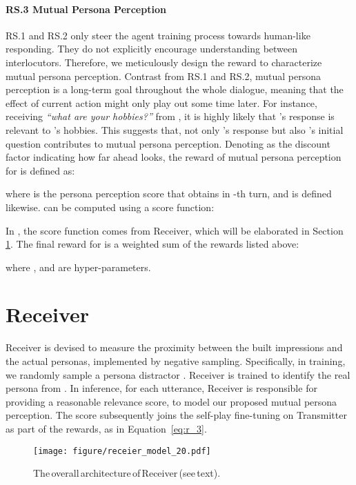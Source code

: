 \documentclass[11pt,a4paper]{article}
\begin{document}
\paragraph{RS.3 Mutual Persona Perception} 
RS.1 and RS.2 only steer the agent training process towards human-like responding. They do not explicitly encourage understanding between interlocutors. Therefore, we meticulously design the reward to characterize mutual persona perception. 
Contrast from RS.1 and RS.2, mutual persona perception is a long-term goal throughout the whole dialogue, 
meaning that the effect of current action might only play out some time later. 
For instance, receiving \textit{``what are your hobbies?''} from , it is highly likely that 's response is relevant to 's hobbies. 
This suggests that, not only 's response but also 's initial question contributes to mutual persona perception. 
Denoting as  the discount factor indicating how far ahead  looks, the reward of mutual persona perception for  is defined as:

where  is the persona perception score that  obtains in -th turn, and  is defined likewise.  can be computed using a score function:

In , the score function comes from Receiver, which will be elaborated in Section \ref{sec-receiver}. The final reward  for  is a weighted sum of the rewards listed above:

where ,  and  are hyper-parameters.

\section{Receiver}
\label{sec-receiver}

Receiver is devised to measure the proximity between the built impressions and the actual personas, implemented by negative sampling. Specifically, in training, we randomly sample a persona distractor . Receiver is trained to identify the real persona  from . In inference, for each utterance, Receiver is responsible for providing a reasonable relevance score, to model our proposed mutual persona perception. The score subsequently joins the self-play fine-tuning on Transmitter as part of the rewards, as in Equation~\ref{eq:r_3}.

\begin{figure}[t]
    \centering
    \texttt{[image: figure/receier\_model\_20.pdf]}
    \caption{The\,overall\,architecture\,of\,Receiver\,(see\,text).}
    \label{fig:receiver_model}
\end{figure}
\end{document}
